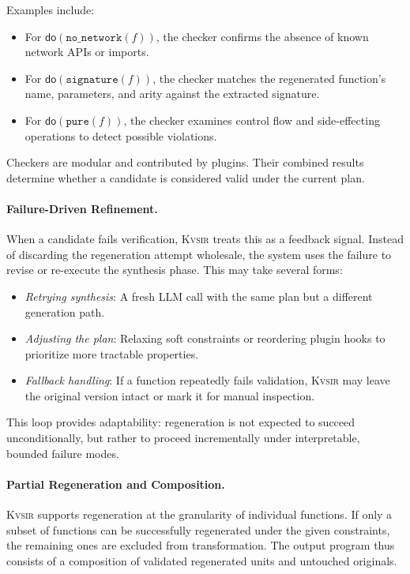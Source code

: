 \documentclass[sigplan]{acmart}
\newcommand{\sys}{{\scshape Kv{\textalpha}sir}\xspace}
\begin{document}
Examples include:
\begin{itemize}
  \item For $\mathsf{do}(\texttt{no\_network}(f))$, the checker confirms the absence of known network APIs or imports.
  \item For $\mathsf{do}(\texttt{signature}(f))$, the checker matches the regenerated function’s name, parameters, and arity against the extracted signature.
  \item For $\mathsf{do}(\texttt{pure}(f))$, the checker examines control flow and side-effecting operations to detect possible violations.
\end{itemize}

Checkers are modular and contributed by plugins. Their combined results determine whether a candidate is considered valid under the current plan.

\paragraph{Failure-Driven Refinement.}
When a candidate fails verification, \sys treats this as a feedback signal. Instead of discarding the regeneration attempt wholesale, the system uses the failure to revise or re-execute the synthesis phase. This may take several forms:
\begin{itemize}
  \item \emph{Retrying synthesis}: A fresh LLM call with the same plan but a different generation path.
  \item \emph{Adjusting the plan}: Relaxing soft constraints or reordering plugin hooks to prioritize more tractable properties.
  \item \emph{Fallback handling}: If a function repeatedly fails validation, \sys may leave the original version intact or mark it for manual inspection.
\end{itemize}

This loop provides adaptability: regeneration is not expected to succeed unconditionally, but rather to proceed incrementally under interpretable, bounded failure modes.

\paragraph{Partial Regeneration and Composition.}
\sys supports regeneration at the granularity of individual functions. If only a subset of functions can be successfully regenerated under the given constraints, the remaining ones are excluded from transformation. The output program thus consists of a composition of validated regenerated units and untouched originals.
\end{document}
